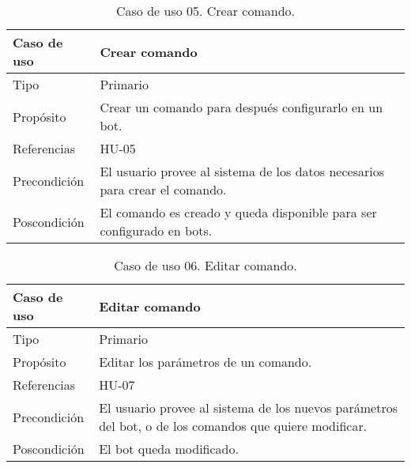\begin{table}[H]
    \centering
    \def\arraystretch{1.25}
    \begin{adjustbox}{max width=\textwidth}
    \begin{tabularx}{\textwidth}{l|L}
    \hline
        \textbf{Caso de uso} & \textbf{Crear comando} \\ \hline
    \hline
        Tipo & Primario \\ \hline
        Propósito & Crear un comando para después configurarlo en un bot. \\ \hline
        Referencias & HU-05 \\ \hline
        Precondición & El usuario provee al sistema de los datos necesarios para crear el comando. \\ \hline
        Poscondición & El comando es creado y queda disponible para ser configurado en bots. \\ \hline
    \end{tabularx}
    \end{adjustbox}
    \caption{Caso de uso 05. Crear comando.}
\end{table}

\begin{table}[H]
    \centering
    \def\arraystretch{1.25}
    \begin{adjustbox}{max width=\textwidth}
    \begin{tabularx}{\textwidth}{l|L}
    \hline
        \textbf{Caso de uso} & \textbf{Editar comando} \\ \hline
    \hline
        Tipo & Primario \\ \hline
        Propósito & Editar los parámetros de un comando. \\ \hline
        Referencias & HU-07 \\ \hline
        Precondición & El usuario provee al sistema de los nuevos parámetros del bot, o de los comandos que quiere modificar. \\ \hline
        Poscondición & El bot queda modificado. \\ \hline
    \end{tabularx}
    \end{adjustbox}
    \caption{Caso de uso 06. Editar comando.}
\end{table}

